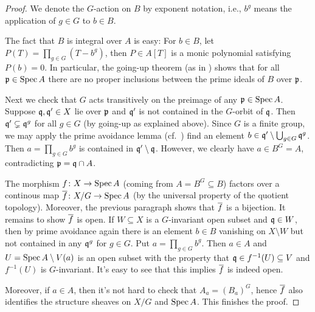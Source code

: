 \documentclass[a4paper,parskip=half,numbers=enddot, DIV=12]{scrreprt}
\begin{document}
\begin{proof}
	We denote the $G$-action on $B$ by exponent notation, i.e., $b^g$ means the application of $g\in G$ to $b\in B$. 
	
	The fact that $B$ is integral over $A$ is easy: For $b\in B$, let $P(T)=\prod_{g\in G}(T-b^g)$, then $P\in A[T]$ is a monic polynomial satisfying $P(b)=0$. In particular, the going-up theorem (as in \cite[Theorem~7]{alg1}) shows that for all $\mathfrak{p}\in \operatorname{Spec} A$ there are no proper inclusions between the prime ideals of $B$ over $\mathfrak{p}$.
	
	Next we check that $G$ acts transitively on the preimage of any $\mathfrak{p}\in\operatorname{Spec} A$. Suppose $\mathfrak{q},\mathfrak{q}'\in X$ lie over $\mathfrak{p}$  and $\mathfrak{q}'$ is not contained in the $G$-orbit of $\mathfrak{q}$. Then $\mathfrak{q}'\subsetneq \mathfrak{q}^g$ for all $g\in G$ (by going-up as explained above). Since $G$ is a finite group, we may apply the prime avoidance lemma (cf.\ \cite[Lemma~2.5.1]{alg1}) find an element $b\in\mathfrak{q}'\setminus \bigcup_{g\in G}\mathfrak{q}^g$. Then $a=\prod_{g\in G}b^g$ is contained in $\mathfrak{q}'\setminus \mathfrak{q}$. However, we clearly have $a\in B^G=A$, contradicting $\mathfrak{p}=\mathfrak{q}\cap A$.
	
	The morphism $f\colon X\morphism\Spec A$ (coming from $A=B^G\subseteq B$) factors over a continous map $\ov{f}\colon X/G\morphism \Spec A$ (by the universal property of the quotient topology). Moreover, the previous paragraph shows that $\overline{f}$ is a bijection. It remains to show $\overline{f}$ is open. If $W\subseteq X$ is a $G$-invariant open subset and $\mathfrak{q}\in W$, then by prime avoidance again there is an element $b\in B$ vanishing on $X\setminus W$ but not contained in any $\mathfrak{q}^g$ for $g\in G$. Put $a=\prod_{g\in G}b^g$. Then $a\in A$ and $U=\operatorname{Spec} A\setminus V(a)$ is an open subset with the property that $\mathfrak{q}\in f^{-1}(U)\subseteq V$ and $f^{-1}(U)$ is $G$-invariant. It's easy to see that this implies $\overline{f}$ is indeed open.
	
	Moreover, if $a\in A$, then it's not hard to check that $A_a=(B_a)^G$, hence $\overline{f}$ also identifies the structure sheaves on $X/G$ and $\operatorname{Spec} A$. This finishes the proof.
\end{proof}
\end{document}
